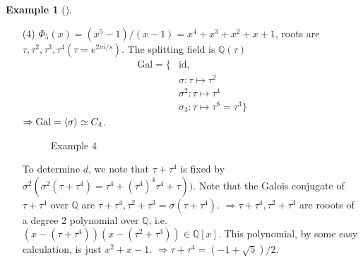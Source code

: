 \documentclass{article}
\theoremstyle{definition}
\newtheorem{ex}{Example}
\newenvironment{exs}[1][]{%
  \begin{ex}[#1]$ $\par\nobreak\ignorespaces
}{%
  \end{ex}
}
\newcommand{\QQ}{\mathbb Q}
\newcommand{\Ra}{\Rightarrow}
\begin{document}
\begin{exs}
\begin{enumerate}
\begin{figure}[H]
\begin{tikzpicture}
						\end{tikzpicture}
					\caption{Example 3}
				\end{figure}

			\item[(4)] $\Phi_5(x) = (x^5 - 1)/(x - 1) = x^4 + x^3 + x^2 + x + 1$, roots are $\tau, \tau^2, \tau^3, \tau^4 (\tau = e^{2 \pi i/s})$.
				The splitting field is $\QQ(\tau)$
				\[
					\begin{split}
						\text{Gal} = \{&\text{id},\\
						&\sigma: \tau \mapsto \tau^2\\
						&\sigma^2: \tau \mapsto \tau^4\\
						&\sigma_3: \tau \mapsto \tau^8 = \tau^3\}
					\end{split}
				\]
				$\Ra \text{Gal} = \ev{\sigma} \simeq C_4$.

				\begin{figure}[H]
					\centering
					\caption{Example 4}
				\end{figure}
				To determine $d$, we note that $\tau + \tau^4$ is fixed by $\sigma^2 (\sigma^2 (\tau + \tau^4) = \tau^4 + (\tau^4)^4  \tau^4 + \tau))$.
				Note that the Galois conjugate of $\tau + \tau^4$ over $\QQ$ are $\tau + \tau^4, \tau^2 + \tau^3 = \sigma(\tau + \tau^4)$.
				$\Ra \tau + \tau^4, \tau^2 + \tau^3$ are rooots of a degree 2 polynomial over $\QQ$, i.e. $(x - (\tau + \tau^4))(x - (\tau^2 + \tau^3)) \in \QQ[x]$.
				This polynomial, by some easy calculation, is just $x^2 + x - 1$.
				$\Ra \tau + \tau^4 = (-1 + \sqrt{5})/2$.


\end{enumerate}
\end{exs}
\end{document}
